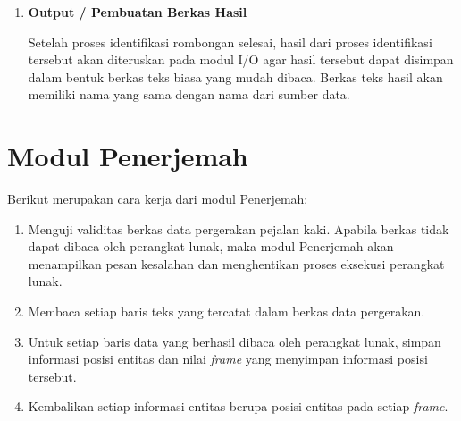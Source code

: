 \begin{enumerate}
    \item \textbf{Output / Pembuatan Berkas Hasil}
    
    Setelah proses identifikasi rombongan selesai, hasil dari proses identifikasi tersebut akan diteruskan pada modul I/O agar hasil tersebut dapat disimpan dalam bentuk berkas teks biasa yang mudah dibaca. Berkas teks hasil akan memiliki nama yang sama dengan nama dari sumber data. 
    
    \iffalse
    
    Sebuah rombongan yang teridentifikasi akan dicatat sebagai satu baris dalam berkas teks yang dihasilkan. Rombongan tersebut akan dicatat dalam bentuk \texttt{<anggota> <frame-mulai> <frame-berakhir>}. Nilai dari \texttt{<anggota>} merupakan nomor identitas dari setiap anggota rombongan yang akan dipisahkan menggunakan koma. Fungsionalitas ini akan diimplementasikan sebagai fungsi \texttt{writeResultToFile}. Fungsionalitas ini akan diimplementasikan menggunakan pustaka standar bawaan C++17.
    
    \fi
\end{enumerate}

\section{Modul Penerjemah}
\label{sec:des-parser}

Berikut merupakan cara kerja dari modul Penerjemah:

\begin{enumerate}
    \item Menguji validitas berkas data pergerakan pejalan kaki. Apabila berkas tidak dapat dibaca oleh perangkat lunak, maka modul Penerjemah akan menampilkan pesan kesalahan dan menghentikan proses eksekusi perangkat lunak.
    \item Membaca setiap baris teks yang tercatat dalam berkas data pergerakan.
    
    \iffalse 
    
    \cristopher{Kudu jelasin gak sih ko bentuk datanya gimana?} \lionov{gak usah lah, bilang aja pokoknya ini buat nerima input, nanti di ``implementasi'' baru dijelasin setelah ngejelasin datanya kayak apa}
    
    \fi
    
    \item Untuk setiap baris data yang berhasil dibaca oleh perangkat lunak, simpan informasi posisi entitas dan nilai \textit{frame} yang menyimpan informasi posisi tersebut.
    \item Kembalikan setiap informasi entitas berupa posisi entitas pada setiap \textit{frame}.
\end{enumerate}

